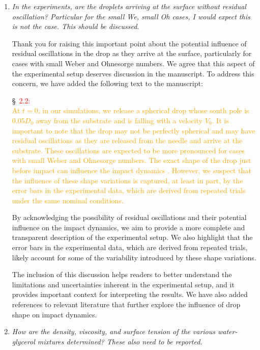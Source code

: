 \documentclass[]{article}
\newcommand*\red{\textcolor{red}}
\newcommand{\VS}[1]{{\textcolor{orange}{#1}}}
\begin{document}
\begin{enumerate}
	\item \textit{In the experiments, are the droplets arriving at the surface without residual oscillation? Particular for the small We, small Oh cases, I would expect this is not the case. This should be discussed.}
	
	Thank you for raising this important point about the potential influence of residual oscillations in the drop as they arrive at the surface, particularly for cases with small Weber and Ohnesorge numbers. We agree that this aspect of the experimental setup deserves discussion in the manuscript.
	To address this concern, we have added the following text to the manuscript:
	
	\S~\red{2.2:}\\
	\VS{At $t = 0$, in our simulations, we release a spherical drop whose south pole is $0.05D_0$ away from the substrate and is falling with a velocity $V_0$. It is important to note that the drop may not be perfectly spherical and may have residual oscillations as they are released from the needle and arrive at the substrate. These oscillations are expected to be more pronounced for cases with small Weber and Ohnesorge numbers. The exact shape of the drop just before impact can influence the impact dynamics \citep{thoraval-2013-jfm, yun2017bouncing}. However, we suspect that the influence of these shape variations is captured, at least in part, by the error bars in the experimental data, which are derived from repeated trials under the same nominal conditions.}
	
	By acknowledging the possibility of residual oscillations and their potential influence on the impact dynamics, we aim to provide a more complete and transparent description of the experimental setup. We also highlight that the error bars in the experimental data, which are derived from repeated trials, likely account for some of the variability introduced by these shape variations.
	
	The inclusion of this discussion helps readers to better understand the limitations and uncertainties inherent in the experimental setup, and it provides important context for interpreting the results. We have also added references to relevant literature \citep{thoraval-2013-jfm, yun2017bouncing} that further explore the influence of drop shape on impact dynamics.
	
	\item \textit{How are the density, viscosity, and surface tension of the various water-glycerol mixtures determined? These also need to be reported.}
	

\end{enumerate}
\end{document}

